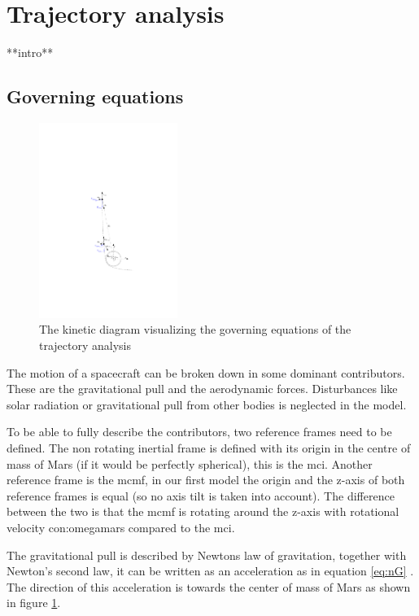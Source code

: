\section{Trajectory analysis} \label{ch:trajectory}

**intro**

\subsection{Governing equations}\label{sec:gov}

\begin{figure}
		\centering
		\includegraphics[width = 0.4\textwidth]{Figure/orbital_mechanics.pdf}
		\caption{The kinetic diagram visualizing the governing equations of the trajectory analysis}
		\label{fig:orb}
\end{figure}

The motion of a spacecraft can be broken down in some dominant contributors. These are the gravitational pull and the aerodynamic forces. Disturbances like solar radiation or gravitational pull from other bodies is neglected in the model.

To be able to fully describe the contributors, two reference frames need to be defined. The non rotating inertial frame is defined with its origin in the centre of mass of Mars (if it would be perfectly spherical), this is the \gls{mci}. 
Another reference frame is the \gls{mcmf}, in our first model the origin and the z-axis of both reference frames is equal (so no axis tilt is taken into account). The difference between the two is that the \gls{mcmf} is rotating around the z-axis with rotational velocity \gls{con:omegamars} compared to the \gls{mci}.

The gravitational pull is described by Newtons law of gravitation, together with Newton's second law, it can be written as an acceleration as in equation \ref{eq:nG} \cite{Weiland2004}. The direction of this acceleration is towards the center of mass of Mars as shown in figure \ref{fig:orb}.

